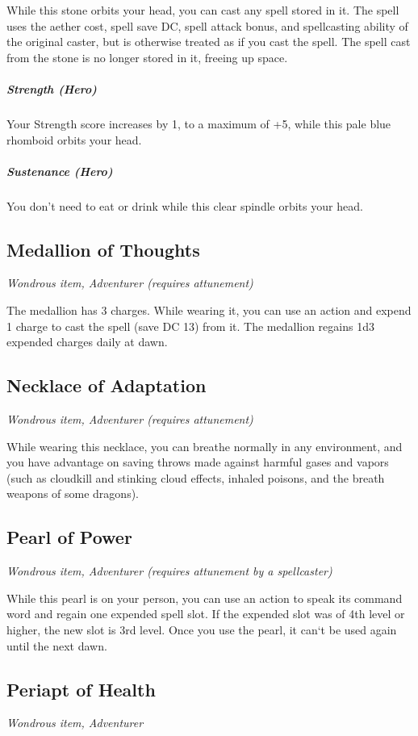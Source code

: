 While this stone orbits your head, you can cast any spell stored in it. The spell uses the aether cost, spell save DC, spell attack bonus, and spellcasting ability of the original caster, but is otherwise treated as if you cast the spell. The spell cast from the stone is no longer stored in it, freeing up space.

\subparagraph*{Strength (Hero)} Your Strength score increases by 1, to a maximum of +5, while this pale blue rhomboid orbits your head.

\subparagraph*{Sustenance (Hero)} You don't need to eat or drink while this clear spindle orbits your head.

\subsection{Medallion of Thoughts}
\textit{Wondrous item, Adventurer (requires attunement)}

The medallion has 3 charges. While wearing it, you can use an action and expend 1 charge to cast the  spell (save DC 13) from it. The medallion regains 1d3 expended charges daily at dawn.

\subsection{Necklace of Adaptation}
\textit{Wondrous item, Adventurer (requires attunement)}

While wearing this necklace, you can breathe normally in any environment, and you have advantage on saving throws made against harmful gases and vapors (such as cloudkill and stinking cloud effects, inhaled poisons, and the breath weapons of some dragons).

\subsection{Pearl of Power}
\textit{Wondrous item, Adventurer (requires attunement by a spellcaster)}

While this pearl is on your person, you can use an action to speak its command word and regain one expended spell slot. If the expended slot was of 4th level or higher, the new slot is 3rd level. Once you use the pearl, it can`t be used again until the next dawn.

\subsection{Periapt of Health}
\textit{Wondrous item, Adventurer}


